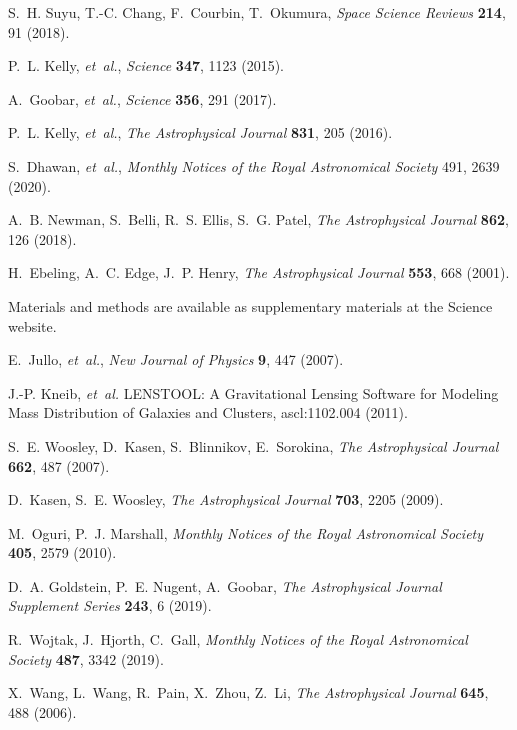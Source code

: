 \documentclass[12pt]{article}
\begin{document}
\begin{thebibliography}{10}
S.~H. Suyu, T.-C. Chang, F.~Courbin, T.~Okumura, {\it Space Science Reviews\/}
  {\bf 214}, 91 (2018).

P.~L. Kelly, {\it et~al.\/}, {\it Science\/} {\bf 347}, 1123 (2015).

A.~Goobar, {\it et~al.\/}, {\it Science\/} {\bf 356}, 291 (2017).

P.~L. Kelly, {\it et~al.\/}, {\it The Astrophysical Journal\/} {\bf 831}, 205
  (2016).

S.~Dhawan, {\it et~al.\/}, {\it Monthly Notices of the Royal Astronomical
  Society\/} 491, 2639 (2020).

A.~B. Newman, S.~Belli, R.~S. Ellis, S.~G. Patel, {\it The Astrophysical
  Journal\/} {\bf 862}, 126 (2018).

H.~Ebeling, A.~C. Edge, J.~P. Henry, {\it The Astrophysical Journal\/} {\bf
  553}, 668 (2001).

Materials and methods are available as supplementary materials at the {Science}
  website.

E.~Jullo, {\it et~al.\/}, {\it New Journal of Physics\/} {\bf 9}, 447 (2007).

J.-P. Kneib, {\it et~al.\/} LENSTOOL: A Gravitational Lensing Software for Modeling Mass Distribution of Galaxies and Clusters, ascl:1102.004 (2011).

S.~E. Woosley, D.~Kasen, S.~Blinnikov, E.~Sorokina, {\it The Astrophysical
  Journal\/} {\bf 662}, 487 (2007).

D.~Kasen, S.~E. Woosley, {\it The Astrophysical Journal\/} {\bf 703}, 2205
  (2009).

M.~Oguri, P.~J. Marshall, {\it Monthly Notices of the Royal Astronomical
  Society\/} {\bf 405}, 2579 (2010).

D.~A. Goldstein, P.~E. Nugent, A.~Goobar, {\it The Astrophysical Journal
  Supplement Series\/} {\bf 243}, 6 (2019).

R.~Wojtak, J.~Hjorth, C.~Gall, {\it Monthly Notices of the Royal Astronomical
  Society\/} {\bf 487}, 3342 (2019).

X.~Wang, L.~Wang, R.~Pain, X.~Zhou, Z.~Li, {\it The Astrophysical Journal\/}
  {\bf 645}, 488 (2006).


\end{thebibliography}
\end{document}
